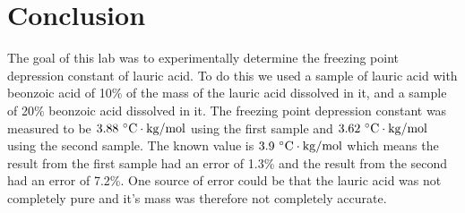 \documentclass[12pt]{article}
\begin{document}
    \section*{Conclusion}
        The goal of this lab was to experimentally determine the freezing point depression constant of lauric acid. To do this we used a sample of lauric acid with beonzoic acid of 10\% of the mass of the lauric acid dissolved in it, and a sample of 20\% beonzoic acid dissolved in it. The freezing point depression constant was measured to be \(3.88~\mathrm{\degree C\cdot kg / mol}\) using the first sample and \(3.62~\mathrm{\degree C\cdot kg / mol}\) using the second sample. The known value is \(3.9~\mathrm{\degree C\cdot kg / mol}\) which means the result from the first sample had an error of 1.3\% and the result from the second had an error of 7.2\%. One source of error could be that the lauric acid was not completely pure and it's mass was therefore not completely accurate.
\end{document}
